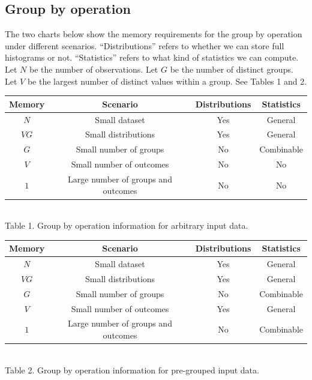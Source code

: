 \subsection{Group by operation}
The two charts below show the memory requirements for the group by operation under different scenarios. ``Distributions'' refers to whether we can store full histograms or not. ``Statistics'' refers to what kind of statistics we can compute. Let $N$ be the number of observations. Let $G$ be the number of distinct groups. Let $V$ be the largest number of distinct values within a group. See Tables 1 and 2. 
\begin{center}
\begin{tabular}{|c|c|c|c|}
\hline
Memory & Scenario                            & Distributions & Statistics \\
\hline
$N$    & Small dataset                       & Yes           & General    \\
$VG$   & Small distributions                 & Yes           & General    \\
$G$    & Small number of groups              & No            & Combinable \\
$V$    & Small number of outcomes            & No            & No         \\
$1$    & Large number of groups and outcomes & No            & No         \\
\hline
\end{tabular}\\
Table 1. Group by operation information for arbitrary input data.
\end{center}
\begin{center}
\begin{tabular}{|c|c|c|c|}
\hline
Memory & Scenario                            & Distributions & Statistics \\
\hline
$N$    & Small dataset                       & Yes           & General    \\
$VG$   & Small distributions                 & Yes           & General    \\
$G$    & Small number of groups              & No            & Combinable \\
$V$    & Small number of outcomes            & Yes           & General    \\
$1$    & Large number of groups and outcomes & No            & Combinable \\
\hline
\end{tabular}\\
Table 2. Group by operation information for pre-grouped input data.\\
\end{center}

